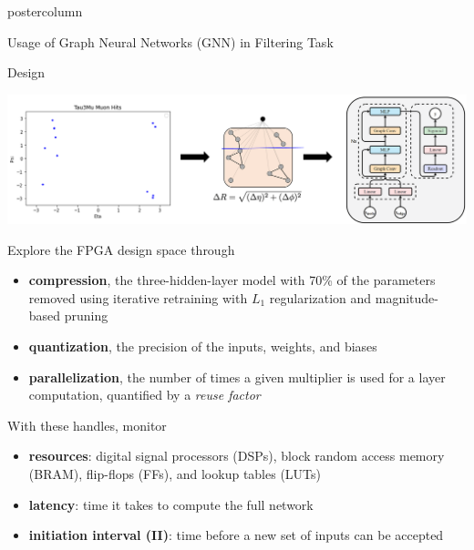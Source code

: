 \documentclass[final,hyperref={pdfpagelabels=false}]{beamer}
\begin{document}
\begin{frame}
\begin{columns}
\begin{column}{.49\textwidth}
\begin{beamercolorbox}[center,wd=\textwidth]{postercolumn}
\begin{minipage}[T]{.95\textwidth}
{\begin{block}{Usage of Graph Neural Networks (GNN) in Filtering Task}
              \end{block}
            \begin{block}{Design}
                  \begin{center}
                    \includegraphics[width=\linewidth]{figures/graph_creation.png}
                  \end{center}
                \vspace{0.5in}
                Explore the FPGA design space through
                \begin{itemize}
                \item {\bf compression}, the three-hidden-layer model with 70\% of the parameters removed using iterative retraining with $L_1$ regularization and magnitude-based pruning
                \item {\bf quantization}, the precision of the inputs, weights, and biases
                \item {\bf parallelization}, the number of times a
                  given multiplier is used for a layer computation,
                  quantified by a \emph{reuse factor}
                \end{itemize}
                \vspace{0.5in}
                With these handles, monitor 
                \begin{itemize}
                \item {\bf resources}: digital signal processors
                  (DSPs), block random access memory (BRAM), flip-flops (FFs), and lookup tables (LUTs)
                \item {\bf latency}: time it takes to compute the full network
                \item {\bf initiation interval (II)}: time before a new set of inputs can be accepted
                \end{itemize}
              \end{block}
              
                }
              \end{minipage}
            \end{beamercolorbox}
          \end{column}


\end{columns}
\end{frame}
\end{document}
